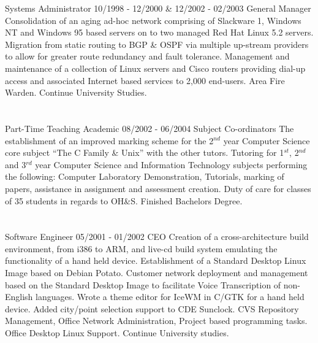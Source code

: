  Systems Administrator
\lskip
{} 10/1998 - 12/2000 \& 12/2002 - 02/2003
 General Manager
 Consolidation of an aging ad-hoc network comprising of Slackware 1, Windows NT and Windows 95 based servers on to two managed Red Hat Linux 5.2 servers.
\dashtopic Migration from static routing to BGP \& OSPF via multiple up-stream providers to allow for greater route redundancy and fault tolerance.
 Management and maintenance of a collection of Linux servers and Cisco routers providing dial-up access and associated Internet based services to 2,000 end-users.
\dashtopic Area Fire Warden.
 Continue University Studies.
\pskip

\section{\UOW}

\lskip
{} Part-Time Teaching Academic
 08/2002 - 06/2004
 Subject Co-ordinators
 The establishment of an improved marking scheme for the 2$^{nd}$ year Computer Science core subject ``The C Family \& Unix'' with the other tutors.
 Tutoring for 1$^{st}$, 2$^{nd}$ and 3$^{rd}$ year Computer Science and Information Technology subjects performing the following: Computer Laboratory Demonstration, Tutorials, marking of papers, assistance in assignment and assessment creation.
\dashtopic Duty of care for classes of 35 students in regards to OH\&S.
 Finished Bachelors Degree.
\pskip

\section{\FST}

\lskip
{} Software Engineer
 05/2001 - 01/2002
 CEO
 Creation of a cross-architecture build environment, from i386 to ARM, and live-cd build system emulating the functionality of a hand held device.
\dashtopic Establishment of a Standard Desktop Linux Image based on Debian {\mi Potato}.
\dashtopic Customer network deployment and management based on the Standard Desktop Image to facilitate Voice Transcription of non-English languages.
\dashtopic Wrote a theme editor for IceWM in C/GTK for a hand held device.
\dashtopic Added city/point selection support to CDE Sunclock.
 CVS Repository Management, Office Network Administration, Project based programming tasks.
\dashtopic Office Desktop Linux Support.
 Continue University studies.
\pskip

